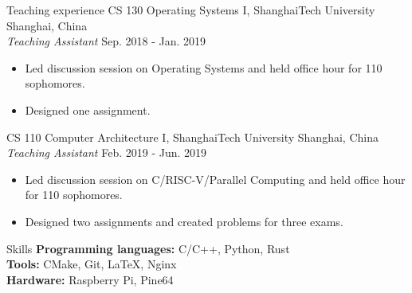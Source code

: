 \documentclass{resume} %
\begin{document}
\begin{rSection}{Teaching experience}
CS 130 Operating Systems I, ShanghaiTech University \hfill {Shanghai, China}\\
\textit{Teaching Assistant} \hfill {Sep. 2018 - Jan. 2019}
\begin{itemize}
    \item Led discussion session on Operating Systems and held office hour for 110 sophomores.
    \item Designed one assignment.
\end{itemize}

CS 110 Computer Architecture I, ShanghaiTech University \hfill {Shanghai, China}\\
\textit{Teaching Assistant} \hfill {Feb. 2019 - Jun. 2019}
\begin{itemize}
    \item Led discussion session on C/RISC-V/Parallel Computing and held office hour for 110 sophomores.
    \item Designed two assignments and created problems for three exams.
\end{itemize}
\end{rSection}

\begin{rSection}{Skills}
{\bf Programming languages:} C/C++, Python, Rust\\
{\bf Tools:} CMake, Git, \LaTeX, Nginx\\
{\bf Hardware:} Raspberry Pi, Pine64
\end{rSection}
\end{document}
